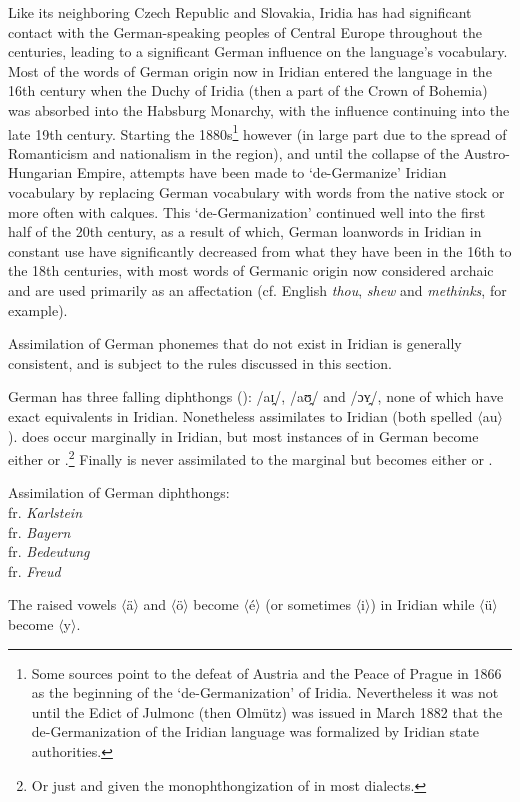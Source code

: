 Like its neighboring Czech Republic and Slovakia, Iridia has had significant contact with the German-speaking peoples of Central Europe throughout the centuries, leading to a significant German influence on the language's vocabulary. Most of the words of German origin now in Iridian entered the language in the 16th century when the Duchy of Iridia (then a part of the Crown of Bohemia) was absorbed into the Habsburg Monarchy, with the influence continuing into the late 19th century. Starting the 1880s\footnote{Some sources point to the defeat of Austria and the Peace of Prague in 1866 as the beginning of the `de-Germanization' of Iridia. Nevertheless it was not until the Edict of Julmonc (then Olm\"utz) was issued in March 1882 that the de-Germanization of the Iridian language was formalized by Iridian state authorities.} however (in large part due to the spread of Romanticism and nationalism in the region), and until the collapse of the Austro-Hungarian Empire, attempts have been made to `de-Germanize' Iridian vocabulary by replacing German vocabulary with words from the native stock or more often with calques. This `de-Germanization' continued well into the first half of the 20th century, as a result of which, German loanwords in Iridian in constant use have significantly decreased from what they have been in the 16th to the 18th centuries, with most words of Germanic origin now considered archaic and are used primarily as an affectation (cf. English \emph{thou}, \emph{shew} and \emph{methinks}, for example).

Assimilation of German phonemes that do not exist in Iridian is generally consistent, and is subject to the rules discussed in this section.

German has three falling diphthongs (\cite{wiese1996}): /aɪ̯/, /aʊ̯/ and /ɔʏ̯/, none of which have exact equivalents in Iridian. Nonetheless  assimilates to Iridian  (both spelled $\langle$au$\rangle$).  does occur marginally in Iridian, but most instances of  in German become either  or .\footnote{Or just  and  given the monophthongization of  in most dialects.} Finally  is never assimilated to the marginal  but becomes either  or .


\ex
Assimilation of German diphthongs:\\
 fr. \emph{Karlstein}\\
 fr. \emph{Bayern}\\
 fr. \emph{Bedeutung}\\
 fr. \emph{Freud}
\xe

The raised vowels $\langle$\"a$\rangle$ and $\langle$\"o$\rangle$ become  $\langle$\'e$\rangle$ (or sometimes  $\langle$i$\rangle$) in Iridian while $\langle$\"u$\rangle$ become  $\langle$y$\rangle$.
